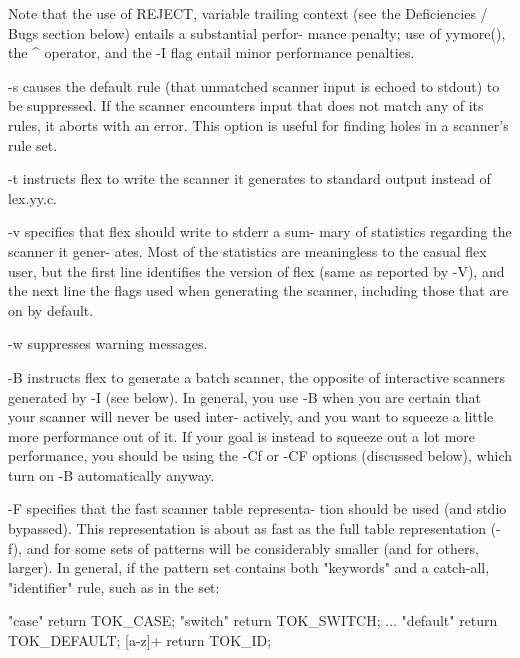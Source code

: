 \documentclass[12pt,spanish,twocolumn,lettersize]{article}
\begin{document}
{	      Note  that the use of REJECT, %
	      variable trailing context (see the  Deficiencies	/
	      Bugs  section  below) entails a substantial perfor-
	      mance penalty; use of yymore(), the ^ operator, and
	      the -I flag entail minor performance penalties.

       -s     causes  the  default  rule  (that unmatched scanner
	      input is echoed to stdout) to  be	 suppressed.   If
	      the  scanner  encounters	input that does not match
	      any of its rules, it aborts with	an  error.   This
	      option  is  useful for finding holes in a scanner's
	      rule set.

       -t     instructs flex to write the scanner it generates to
	      standard output instead of lex.yy.c.

       -v     specifies	 that  flex should write to stderr a sum-
	      mary of statistics regarding the scanner it  gener-
	      ates.   Most  of	the statistics are meaningless to
	      the casual flex user, but the first line identifies
	      the  version  of flex (same as reported by -V), and
	      the next line the flags used  when  generating  the
	      scanner, including those that are on by default.

       -w     suppresses warning messages.

       -B     instructs	 flex  to  generate  a batch scanner, the
	      opposite of interactive scanners	generated  by  -I
	      (see  below).   In general, you use -B when you are
	      certain that your scanner will never be used inter-
	      actively,	 and  you  want	 to squeeze a little more
	      performance out of it.  If your goal is instead  to
	      squeeze  out a lot more performance, you should  be
	      using the -Cf or	-CF  options  (discussed  below),
	      which turn on -B automatically anyway.

       -F     specifies	 that  the fast scanner table representa-
	      tion should be used  (and	 stdio	bypassed).   This
	      representation  is  about as fast as the full table
	      representation (-f), and for some sets of	 patterns
	      will  be	considerably  smaller  (and  for  others,
	      larger).	In general, if the pattern  set	 contains
	      both "keywords" and a catch-all, "identifier" rule,
	      such as in the set:

		  "case"    return TOK_CASE;
		  "switch"  return TOK_SWITCH;
		  ...
		  "default" return TOK_DEFAULT;
		  [a-z]+    return TOK_ID;

}
\end{document}
